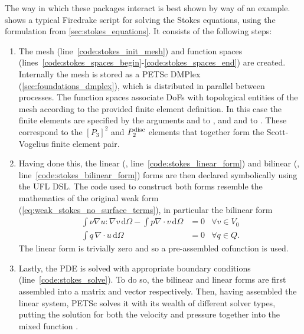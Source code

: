 \documentclass[thesis]{subfiles}
\begin{document}
The way in which these packages interact is best shown by way of an example.
 shows a typical Firedrake script for solving the Stokes equations, using the formulation from \cref{sec:stokes_equations}.
It consists of the following steps:
\begin{enumerate}
  \item
    The mesh (line~\ref{code:stokes_init_mesh}) and function spaces (lines~\ref{code:stokes_spaces_begin}-\ref{code:stokes_spaces_end}) are created.
    Internally the mesh is stored as a PETSc DMPlex (\cref{sec:foundations_dmplex}), which is distributed in parallel between processes.
    The function spaces associate DoFs with topological entities of the mesh according to the provided finite element definition.
    In this case the finite elements are specified by the arguments  and  to , and  and  to .
    These correspond to the $[P_3]^2$ and $P_2^{\textnormal{disc}}$ elements that together form the Scott-Vogelius finite element pair.

  \item
    Having done this, the linear (, line~\ref{code:stokes_linear_form}) and bilinear (, line~\ref{code:stokes_bilinear_form}) forms are then declared symbolically using the UFL DSL.
    The code used to construct both forms resemble the mathematics of the original weak form (\cref{eq:weak_stokes_no_surface_terms}), in particular the bilinear form
    \begin{equation}
      \begin{aligned}
        \int \nu \nabla u : \nabla v \, \textrm{d}\Omega
        - \int p \nabla \cdot v \, \textrm{d}\Omega
        &= 0
        &\forall v \in V_0 \\
        \int q \, \nabla \cdot u \, \textrm{d}\Omega
        &= 0
        &\forall q \in Q.
      \end{aligned}
    \end{equation}
    The linear form is trivially zero and so a pre-assembled cofunction is used.

  \item
    Lastly, the PDE is solved with appropriate boundary conditions (line~\ref{code:stokes_solve}).
    To do so, the bilinear and linear forms are first assembled into a matrix and vector respectively.
    Then, having assembled the linear system, PETSc solves it with its wealth of different solver types, putting the solution for both the velocity and pressure together into the mixed function .
\end{enumerate}
\end{document}
